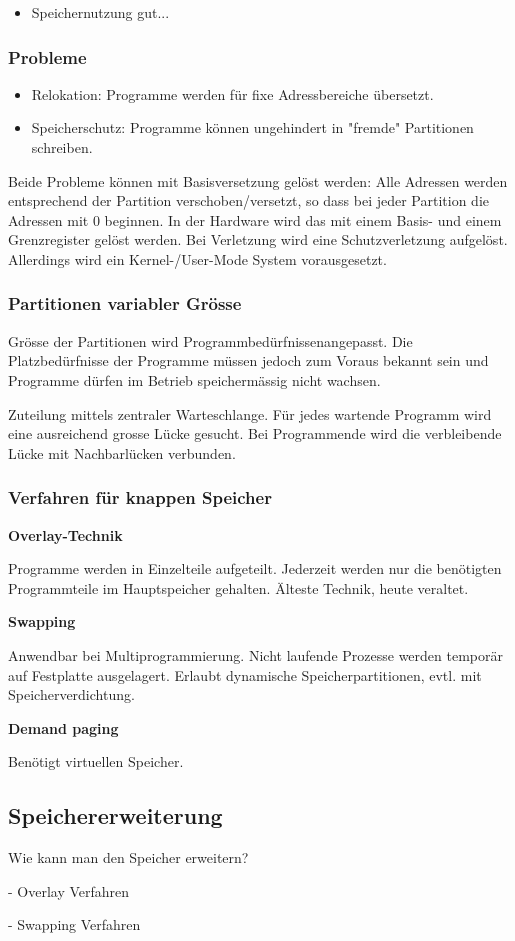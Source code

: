 \begin{itemize}
	\item Speichernutzung gut...
\end{itemize}

\subsubsection{Probleme}

\begin{itemize}
	\item Relokation: Programme werden für fixe Adressbereiche übersetzt.
	\item Speicherschutz: Programme können ungehindert in "fremde" Partitionen
		schreiben.
\end{itemize}

Beide Probleme können mit Basisversetzung gelöst werden: Alle Adressen werden
entsprechend der Partition verschoben/versetzt, so dass bei jeder Partition die
Adressen mit 0 beginnen. In der Hardware wird das mit einem Basis- und einem
Grenzregister gelöst werden. Bei Verletzung wird eine Schutzverletzung
aufgelöst. Allerdings wird ein Kernel-/User-Mode System vorausgesetzt.

\subsubsection{Partitionen variabler Grösse}

Grösse der Partitionen wird Programmbedürfnissenangepasst. Die Platzbedürfnisse
der Programme müssen jedoch zum Voraus bekannt sein und Programme dürfen im
Betrieb speichermässig nicht wachsen.

Zuteilung mittels zentraler Warteschlange. Für jedes wartende Programm wird eine
ausreichend grosse Lücke gesucht. Bei Programmende wird die verbleibende Lücke
mit Nachbarlücken verbunden.

\subsubsection{Verfahren für knappen Speicher}

\textbf{Overlay-Technik}

Programme werden in Einzelteile aufgeteilt. Jederzeit werden nur die benötigten
Programmteile im Hauptspeicher gehalten. Älteste Technik, heute veraltet.

\textbf{Swapping}

Anwendbar bei Multiprogrammierung. Nicht laufende Prozesse werden temporär auf
Festplatte ausgelagert. Erlaubt dynamische Speicherpartitionen, evtl. mit
Speicherverdichtung.

\textbf{Demand paging}

Benötigt virtuellen Speicher.


\subsection{Speichererweiterung}

Wie kann man den Speicher erweitern?

- Overlay Verfahren

- Swapping Verfahren
